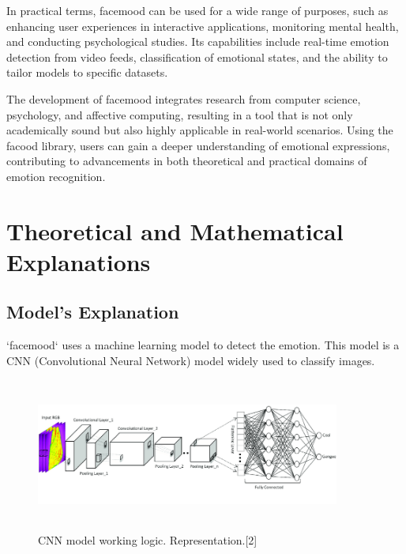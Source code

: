 \documentclass{article}
\begin{document}
\vspace{0.5cm}

In practical terms, facemood can be used for a wide range of purposes, such as enhancing user experiences in interactive applications, monitoring mental health, and conducting psychological studies. Its capabilities include real-time emotion detection from video feeds, classification of emotional states, and the ability to tailor models to specific datasets.

\vspace{0.5cm}

The development of facemood integrates research from computer science, psychology, and affective computing, resulting in a tool that is not only academically sound but also highly applicable in real-world scenarios. Using the facood library, users can gain a deeper understanding of emotional expressions, contributing to advancements in both theoretical and practical domains of emotion recognition.

\vspace{7cm}

\section{Theoretical and Mathematical Explanations}

\subsection{Model's Explanation}

`facemood` uses a machine learning model to detect the emotion. This model is a CNN (Convolutional Neural Network) model widely used to classify images.

\begin{figure}[h]
    \centering 
    \includegraphics[width=10cm,height=5cm]{image1.png}
    \caption{CNN model working logic. Representation.[2]}
    \label{fig:w_logic}
\end{figure}
\end{document}
